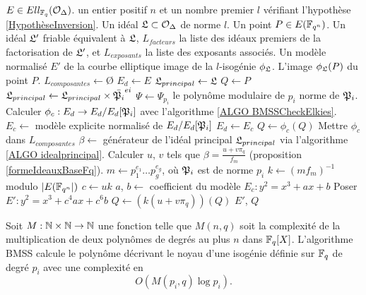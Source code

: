 \begin{algorithm}[H]
	\caption{Calcul d'isogénies par équivalence friable}\label{ALGO IsogenieEquivalenceFriable}
	\begin{algorithmic}[1]
		\Require $E\in Ell_{\mathbb{F}_{q}}(\mathcal{O}_{\Delta})$. un entier positif $n$ et un nombre premier $l$ vérifiant l'hypothèse \ref{HypothèseInversion}. Un idéal $\mathfrak{L}\subset\mathcal{O}_{\Delta}$ de norme $l$. Un point $P\in E(\mathbb{F}_{q^{n}})$. Un idéal $\mathfrak{L}'$ friable équivalent à $\mathfrak{L}$, $L_{facteurs}$ la liste des idéaux premiers de la factorisation de $\mathfrak{L}'$, et $L_{exposants}$ la liste des exposants associés.
		\Ensure Un modèle normalisé $E'$ de la courbe elliptique image de la $l$-isogénie $\phi_{\mathfrak{L}}$. L'image $\phi_{\mathfrak{L}}(P)$ du point $P$. 
		\State $L_{composantes}\gets$\O
		\State $E_{d}\gets E$
		\State $\mathfrak{L}_{principal}\gets\mathfrak{L}$
		\State $Q\gets P$
		\State$\mathfrak{L}_{principal}\gets\mathfrak{L}_{principal}\times\bar{\mathfrak{P}_{i}}^{ei}$
		\State$\Psi\gets \Psi_{p_{i}}$ le polynôme modulaire de $p_{i}$ norme de $\mathfrak{P}_{i}$. 
		\State Calculer $\phi_c : E_{d} \rightarrow E_{d}/ E_{d}[\mathfrak{P}_{i}]$ avec l'algorithme \ref{ALGO BMSSCheckElkies}.
		\State $E_c\gets$ modèle explicite normalisé de $E_{d}/ E_{d}[\mathfrak{P}_{i}]$ 
		\State $E_{d}\gets E_c$ 
		\State $Q\gets \phi_c(Q)$
		\State Mettre $\phi_c$ dans $L_{composantes}$
		\EndFor
		\EndFor
		\State $\beta\gets$ générateur de l'idéal principal $\mathfrak{L}_{principal}$ via l'algorithme \ref{ALGO idealprincipal}.
		\State Calculer $u$, $v$ tels que $\beta = \frac{u + v\pi_{q}}{f_{m}}$ (proposition \ref{formeIdeauxBaseFq}).
		\State $m\gets p_{1}^{e_{1}}\ldots p_{g}^{e_{g}}$, où $\mathfrak{P}_{i}$ est de norme $p_{i}$ 
		\State $k\gets (mf_m)^{-1}$ modulo $|E(\mathbb{F}_{q^{n}}|)$
		\State $c\gets uk$
		\State $a$, $b\gets$ coefficient du modèle $E_c : y^2 = x^3 + ax + b$
		\State Poser $E' : y^2 = x^3 + c^4ax + c^6b$
		\State $Q\gets (k(u + v\pi_{q}))(Q)$
		\State \Return $E'$, $Q$
	\end{algorithmic}
\end{algorithm}

\begin{Prop}
	
	Soit $M : \mathbb{N}\times\mathbb{N}\rightarrow\mathbb{N}$ une fonction telle que $M(n,q)$ soit la complexité de la multiplication de deux polynômes de degrés au plus $n$ dans $\mathbb{F}_{q}[X]$. L'algorithme BMSS calcule le polynôme décrivant le noyau d'une isogénie définie sur $\mathbb{F}_{q}$ de degré $p_{i}$ avec une complexité en 
	\begin{equation*}
		O\left( M(p_{i},q)\log p_{i}\right).
	\end{equation*}
\end{Prop}

